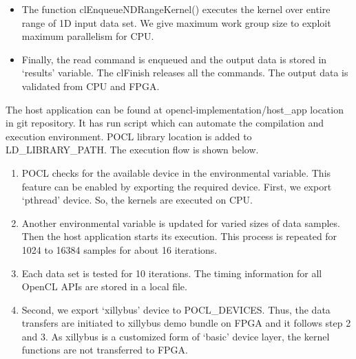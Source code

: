 \begin{itemize}
	
	\item The function clEnqueueNDRangeKernel() executes the kernel over entire range of 1D input data set. We give maximum work group size to exploit maximum parallelism for CPU. 
	
	\item Finally, the read command is enqueued and the output data is stored in ‘results’ variable. The clFinish releases all the commands. The output data is validated from CPU and FPGA. 
\end{itemize}

The host application can be found at opencl-implementation/host\_app location in git repository. It has run script which can automate the compilation and execution environment. POCL library location is added to LD\_LIBRARY\_PATH. The execution flow is shown below.
\begin{enumerate}
	\item POCL checks for the available device in the environmental variable. This feature can be enabled by exporting the required device. First, we export ‘pthread’ device. So, the kernels are executed on CPU.
	\item Another environmental variable is updated for varied sizes of data samples. Then the host application starts its execution. This process is repeated for 1024 to 16384 samples for about 16 iterations. 
	\item Each data set is tested for 10 iterations. The timing information for all OpenCL APIs are stored in a local file.
	\item Second, we export ‘xillybus’ device to POCL\_DEVICES. Thus, the data transfers are initiated to xillybus demo bundle on FPGA and it follows step 2 and 3. As xillybus is a customized form of ‘basic’ device layer, the kernel functions are not transferred to FPGA. 
\end{enumerate}

